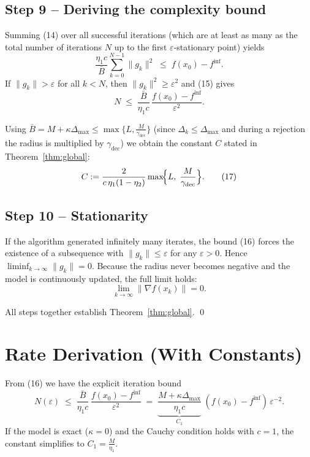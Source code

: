 \documentclass{article}
\begin{document}
\subsection*{Step 9 – Deriving the complexity bound}
Summing (14) over all successful iterations (which are at least as many as the total number of iterations $N$ up to the first $\varepsilon$‑stationary point) yields
\[
\frac{\eta_1 c}{\bar{B}}\sum_{k=0}^{N-1}\|g_k\|^{2}
\;\le\; f(x_0)-f^{\inf}. \tag{15}
\]
If $\|g_k\|>\varepsilon$ for all $k<N$, then $\|g_k\|^{2}\ge\varepsilon^{2}$ and (15) gives
\[
N\;\le\;\frac{\bar{B}}{\eta_1 c}\,\frac{f(x_0)-f^{\inf}}{\varepsilon^{2}}. \tag{16}
\]

Using $\bar{B}=M+\kappa\Delta_{\max}\le \max\{L,\frac{M}{\gamma_{\text{dec}}}\}$ (since $\Delta_k\le\Delta_{\max}$ and during a rejection the radius is multiplied by $\gamma_{\text{dec}}$) we obtain the constant $C$ stated in Theorem~\ref{thm:global}:
\[
C:=\frac{2}{c\,\eta_1(1-\eta_2)}\max\!\Bigl\{L,\;\frac{M}{\gamma_{\text{dec}}}\Bigr\}. \tag{17}
\]

\subsection*{Step 10 – Stationarity}
If the algorithm generated infinitely many iterates, the bound (16) forces the existence of a subsequence with $\|g_k\|\le\varepsilon$ for any $\varepsilon>0$. Hence $\liminf_{k\to\infty}\|g_k\|=0$. Because the radius never becomes negative and the model is continuously updated, the full limit holds:
\[
\lim_{k\to\infty}\|\nabla f(x_k)\|=0. \tag{18}
\]

All steps together establish Theorem~\ref{thm:global}. \qed

\section*{Rate Derivation (With Constants)}
From (16) we have the explicit iteration bound
\[
N(\varepsilon)\;\le\;\frac{\bar{B}}{\eta_1 c}\,\frac{f(x_0)-f^{\inf}}{\varepsilon^{2}}
\;=\;
\underbrace{\frac{M+\kappa\Delta_{\max}}{\eta_1 c}}_{\displaystyle C_1}
\;(f(x_0)-f^{\inf})\,\varepsilon^{-2}.
\]
If the model is exact ($\kappa=0$) and the Cauchy condition holds with $c=1$, the constant simplifies to $C_1=\frac{M}{\eta_1}$.
\end{document}
